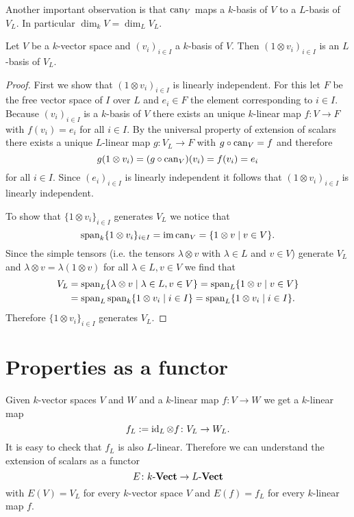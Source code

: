 Another important observation is that $\operatorname{can}_V$ maps a $k$-basis of $V$ to a $L$-basis of $V_L$. In particular $\dim_k V = \dim_L V_L$.


\begin{lem}
 Let $V$ be a $k$-vector space and $(v_i)_{i \in I}$ a $k$-basis of $V$. Then $(1 \otimes v_i)_{i \in I}$ is an $L$-basis of $V_L$.
\end{lem}
\begin{proof}
 First we show that $(1 \otimes v_i)_{i \in I}$ is linearly independent. For this let $F$ be the free vector space of $I$ over $L$ and $e_i \in F$ the element corresponding to $i \in I$. Because $(v_i)_{i \in I}$ is a $k$-basis of $V$ there exists an unique $k$-linear map $f \colon V \to F$ with $f(v_i) = e_i$ for all $i \in I$. By the universal property of extension of scalars there exists a unique $L$-linear map $g \colon V_L \to F$ with $g \circ \operatorname{can}_V = f$ and therefore
 \[
  g(1 \otimes v_i) = (g \circ \operatorname{can}_V)(v_i) = f(v_i) = e_i
 \]
 for all $i \in I$. Since $(e_i)_{i \in I}$ is linearly independent it follows that $(1 \otimes v_i)_{i \in I}$ is linearly independent.
 
 To show that $\{1 \otimes v_i\}_{i \in I}$ generates $V_L$ we notice that
 \[
  \operatorname{span}_k \{1 \otimes v_i\}_{i \in I}
  = \operatorname{im} \operatorname{can}_V
  = \{1 \otimes v \mid v \in V\}.
 \]
 Since the simple tensors (i.e. the tensors $\lambda \otimes v$ with $\lambda \in L$ and $v \in V$) generate $V_L$ and $\lambda \otimes v = \lambda(1 \otimes v)$ for all $\lambda \in L, v \in V$ we find that
 \begin{align*}
  V_L
  &= \operatorname{span}_L \{\lambda \otimes v \mid \lambda \in L, v \in V\}
  = \operatorname{span}_L \{1 \otimes v \mid v \in V\} \\
  &= \operatorname{span}_L \operatorname{span}_k \{1 \otimes v_i \mid i \in I\}
  = \operatorname{span}_L \{1 \otimes v_i \mid i \in I\}.
 \end{align*}
 Therefore $\{1 \otimes v_i\}_{i \in I}$ generates $V_L$.
\end{proof}





\section{Properties as a functor}


Given $k$-vector spaces $V$ and $W$ and a $k$-linear map $f \colon V \to W$ we get a $k$-linear map
\[
 f_L := \operatorname{id}_L \otimes f \colon V_L \to W_L.
\]
It is easy to check that $f_L$ is also $L$-linear. Therefore we can understand the extension of scalars as a functor
\[
 E \colon k\text{-}\mathbf{Vect} \to L\text{-}\mathbf{Vect}
\]
with $E(V) = V_L$ for every $k$-vector space $V$ and $E(f) = f_L$ for every $k$-linear map $f$.

